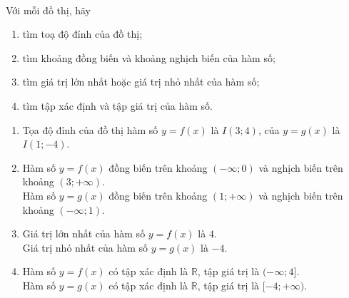 \begin{bt}
\begin{minipage}[c]{0.45\textwidth}
	\end{minipage}\\
	Với mỗi đồ thị, hãy
	\begin{enumerate}
		\item tìm toạ độ đỉnh của đồ thị;
		\item tìm khoảng đồng biến và khoảng nghịch biến của hàm số;
		\item tìm giá trị lớn nhất hoặc giá trị nhỏ nhất của hàm số;
		\item tìm tập xác định và tập giá trị của hàm số.
	\end{enumerate}
	\loigiai
	{
		\begin{enumerate}
			\item Tọa độ đỉnh của đồ thị hàm số $y=f(x)$ là $I(3; 4)$, của $y=g(x)$ là $I(1;-4)$.
			\item Hàm số $y=f(x)$ đồng biến trên khoảng $(-\infty; 0)$ và nghịch biến trên khoảng $(3;+\infty).$\\
			Hàm số $y=g(x)$ đồng biến trên khoảng $(1;+\infty)$ và nghịch biến trên khoảng $(-\infty; 1).$
			\item Giá trị lớn nhất của hàm số $y=f(x)$ là $4.$\\
			Giá trị nhỏ nhất của hàm số $y=g(x)$ là $-4$.
			\item Hàm số $y=f(x)$ có tập xác định là $\mathbb{R}$, tập giá trị là $(-\infty; 4].$\\
		Hàm số $y=g(x)$ có tập xác định là $\mathbb{R}$, tập giá trị là $[-4;+\infty).$
		\end{enumerate}
	}
\end{bt}

